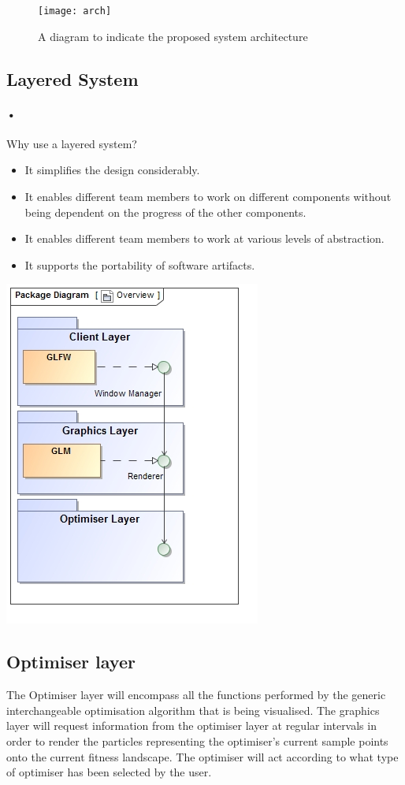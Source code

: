 \documentclass[11pt]{article}
\begin{document}
\pagebreak

\begin{figure}
\texttt{[image: arch]}
\caption{A diagram to indicate the proposed system architecture}
\end{figure}

\subsection{Layered System}
\paragraph{•}
Why use a layered system?
\begin{itemize}
\item It simplifies the design considerably.
\item It enables different team members to work on different components without being dependent on the progress of the other components.
\item It enables different team members to work at various levels of abstraction.
\item It supports the portability of software artifacts.
\end{itemize}
\includegraphics{Overview}
\subsection{Optimiser layer}
The Optimiser layer will encompass all the functions performed by the generic interchangeable optimisation algorithm that is being visualised. The graphics layer will request information from the optimiser layer at regular intervals in order to render the particles representing the optimiser's current sample points onto the current fitness landscape. The optimiser will act according to what type of optimiser has been selected by the user.
\end{document}
